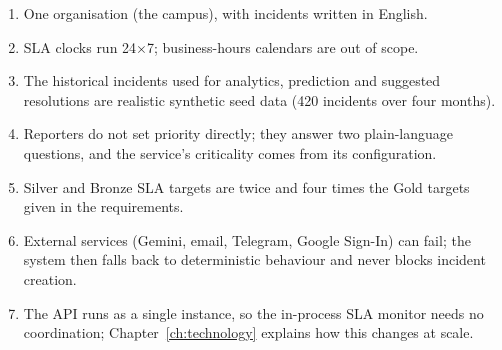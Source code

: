 \begin{enumerate}
  \item One organisation (the campus), with incidents written in English.
  \item SLA clocks run 24$\times$7; business-hours calendars are out of scope.
  \item The historical incidents used for analytics, prediction and suggested resolutions are
    realistic synthetic seed data (420 incidents over four months).
  \item Reporters do not set priority directly; they answer two plain-language questions, and the
    service's criticality comes from its configuration.
  \item Silver and Bronze SLA targets are twice and four times the Gold targets given in the
    requirements.
  \item External services (Gemini, email, Telegram, Google Sign-In) can fail; the system then
    falls back to deterministic behaviour and never blocks incident creation.
  \item The API runs as a single instance, so the in-process SLA monitor needs no coordination;
    Chapter~\ref{ch:technology} explains how this changes at scale.
\end{enumerate}

